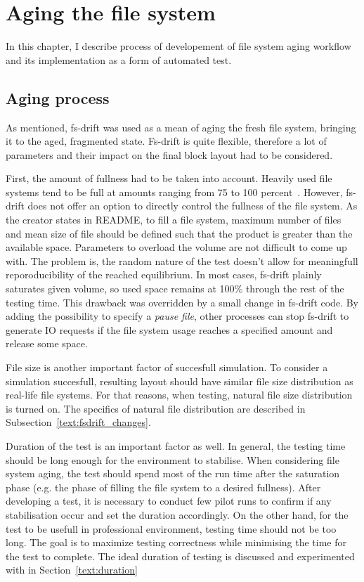 \documentclass[
  color, %
  table, %
  lof,   %
  lot,   %
]{fithesis3}
\begin{document}
\chapter{Aging the file system}\label{text:aging}

In this chapter, I describe process of developement of file system aging workflow and its implementation as a form of automated test.

\section{Aging process}
As mentioned, fs-drift was used as a mean of aging the fresh file system, bringing it to the aged, fragmented state. Fs-drift is quite flexible, therefore a lot of parameters and their impact on the final block layout had to be considered.

First, the amount of fullness had to be taken into account. Heavily used file systems tend to be full at amounts ranging from 75 to 100 percent~\cite{agrawal2007five}. However, fs-drift does not offer an option to directly control the fullness of the file system. As the creator states in README, to fill a file system, maximum number of files and mean size of file should be defined such that the product is greater than the available space. Parameters to overload the volume are not difficult to come up with. The problem is, the random nature of the test doesn't allow for meaningfull reporoducibility of the reached equilibrium. In most cases, fs-drift plainly saturates given volume, so used space remains at 100\% through the rest of the testing time. This drawback was overridden by a small change in fs-drift code\footnotemark[1]. By adding the possibility to specify a \textit{pause file}, other processes can stop fs-drift to generate IO requests if the file system usage reaches a specified amount and release some space.


File size is another important factor of succesfull simulation. To consider a simulation succesfull, resulting layout should have similar file size distribution as real-life file systems. For that reasons, when testing, natural file size distribution is turned on. The specifics of natural file distribution are described in Subsection~\ref{text:fsdrift_changes}.

Duration of the test is an important factor as well. In general, the testing time should be long enough for the environment to stabilise. When considering file system aging, the test should spend most of the run time after the saturation phase (e.g. the phase of filling the file system to a desired fullness). After developing a test, it is necessary to conduct few pilot runs to confirm if any stabilisation occur and set the duration accordingly. On the other hand, for the test to be usefull in professional environment, testing time should not be too long. The goal is to maximize testing correctness while minimising the time for the test to complete. The ideal duration of testing is discussed and experimented with in Section~\ref{text:duration}
\end{document}
